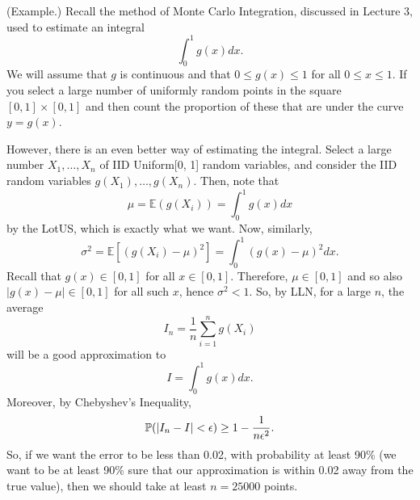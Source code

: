 \documentclass[letterpaper]{article}
\begin{document}
\begin{mdframed}[]
    (Example.) Recall the method of Monte Carlo Integration, discussed in Lecture 3, used to estimate an integral \[\int_0^1 g(x) dx.\] We will assume that $g$ is continuous and that $0 \leq g(x) \leq 1$ for all $0 \leq x \leq 1$. If you select a large number of uniformly random points in the square $[0, 1] \times [0, 1]$ and then count the proportion of these that are under the curve $y = g(x)$. 

    \bigskip 

    However, there is an even better way of estimating the integral. Select a large number $X_1, \dots, X_n$ of IID Uniform[0, 1] random variables, and consider the IID random variables $g(X_1), \dots, g(X_n)$. Then, note that 
    \[\mu = \mathbb{E}(g(X_i)) = \int_0^1 g(x) dx\]
    by the LotUS, which is exactly what we want. Now, similarly,
    \[\sigma^2 = \mathbb{E}[(g(X_i) - \mu)^2] = \int_{0}^1 (g(x) - \mu)^2 dx.\]
    Recall that $g(x) \in [0, 1]$ for all $x \in [0, 1]$. Therefore, $\mu \in [0, 1]$ and so also $|g(x) - \mu| \in [0, 1]$ for all such $x$, hence $\sigma^2 < 1$. So, by LLN, for a large $n$, the average \[I_n = \frac{1}{n} \sum_{i = 1}^{n} g(X_i)\] will be a good approximation to \[I = \int_0^1 g(x) dx.\] Moreover, by Chebyshev's Inequality, \[\mathbb{P}(|I_n - I| < \epsilon) \geq 1 - \frac{1}{n\epsilon^2}.\] So, if we want the error to be less than 0.02, with probability at least 90\% (we want to be at least 90\% sure that our approximation is within 0.02 away from the true value), then we should take at least $n = 25000$ points. 
\end{mdframed}
\end{document}
